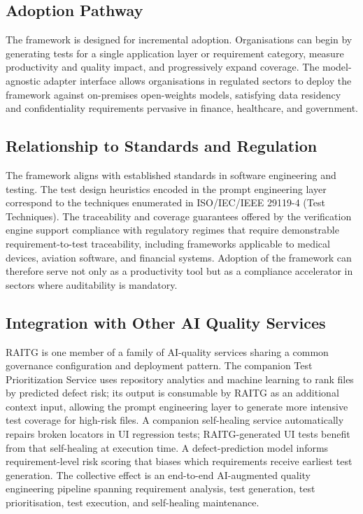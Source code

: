 \documentclass[11pt,letterpaper]{article}
\begin{document}
\subsection{Adoption Pathway}

The framework is designed for incremental adoption. Organisations can begin by generating tests for a single application layer or requirement category, measure productivity and quality impact, and progressively expand coverage. The model-agnostic adapter interface allows organisations in regulated sectors to deploy the framework against on-premises open-weights models, satisfying data residency and confidentiality requirements pervasive in finance, healthcare, and government.

\subsection{Relationship to Standards and Regulation}

The framework aligns with established standards in software engineering and testing. The test design heuristics encoded in the prompt engineering layer correspond to the techniques enumerated in ISO/IEC/IEEE 29119-4 (Test Techniques). The traceability and coverage guarantees offered by the verification engine support compliance with regulatory regimes that require demonstrable requirement-to-test traceability, including frameworks applicable to medical devices, aviation software, and financial systems. Adoption of the framework can therefore serve not only as a productivity tool but as a compliance accelerator in sectors where auditability is mandatory.

\subsection{Integration with Other AI Quality Services}

RAITG is one member of a family of AI-quality services sharing a common governance configuration and deployment pattern. The companion Test Prioritization Service uses repository analytics and machine learning to rank files by predicted defect risk; its output is consumable by RAITG as an additional context input, allowing the prompt engineering layer to generate more intensive test coverage for high-risk files. A companion self-healing service automatically repairs broken locators in UI regression tests; RAITG-generated UI tests benefit from that self-healing at execution time. A defect-prediction model informs requirement-level risk scoring that biases which requirements receive earliest test generation. The collective effect is an end-to-end AI-augmented quality engineering pipeline spanning requirement analysis, test generation, test prioritisation, test execution, and self-healing maintenance.
\end{document}
